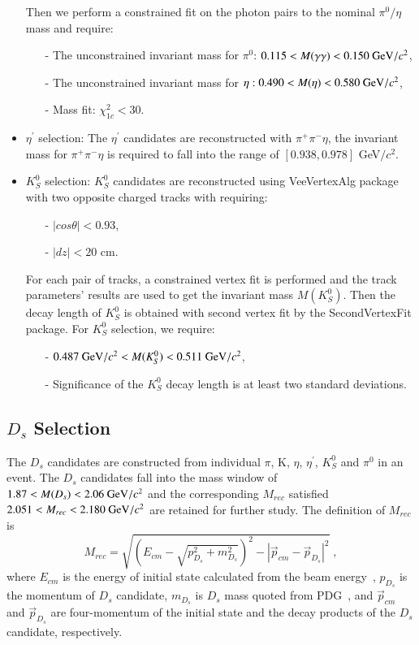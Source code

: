 \begin{itemize}
		Then we perform a constrained fit on the photon pairs to the nominal $\pi^{0}/\eta$ mass and require:
		\begin{itemize}
            \item[-] The unconstrained invariant mass for $\pi^{0}$: $0.115 < M(\gamma\gamma) < 0.150\ {\rm GeV}/c^{2}$,
            \item[-] The unconstrained invariant mass for $\eta: 0.490 < M(\eta) < 0.580\ {\rm GeV}/c^{2}$,
			\item[-] Mass fit: $\chi_{1c}^{2} < 30$.
		\end{itemize}
	\item $\eta^{'}$ selection: The $\eta^{'}$ candidates are reconstructed with $\pi^{+}\pi^{-}\eta$, the invariant mass for $\pi^{+}\pi^{-}\eta$ is required to fall into the range of $[0.938, 0.978]$ GeV$/c^{2}$.
	\item $K_{S}^{0}$ selection: $K_{S}^{0}$ candidates are reconstructed using VeeVertexAlg package with two opposite charged tracks with requiring:
		\begin{itemize}
			\item[-] $|cos\theta| < 0.93$,
			\item[-] $|dz| < 20$ cm.
		\end{itemize}

		For each pair of tracks, a constrained vertex fit is performed and the track parameters' results are used to get the invariant mass $M(K_{S}^{0})$. Then the decay length of $K_{S}^{0}$ is obtained with second vertex 
		fit by the SecondVertexFit package. For $K_{S}^{0}$ selection, we require:
		\begin{itemize}
            \item[-] ${\rm 0.487\ GeV}/c^{2} < M(K_S^{0}) < 0.511\ {\rm GeV}/c^{2}$,
			\item[-] Significance of the $K_{S}^{0}$ decay length is at least two standard deviations.
		\end{itemize}

\end{itemize}
\subsection{$D_{s}$ Selection}
The $D_{s}$ candidates are constructed from individual $\pi$, K, $\eta$, $\eta^{'}$, $K_{S}^{0}$ and $\pi^{0}$ in an event.
The $D_{s}$ candidates fall into the mass window of $1.87 < M(D_{s}) < 2.06\ {\rm GeV}/c^{2}$ and 
the corresponding $M_{rec}$ satisfied $2.051 < M_{rec} < 2.180\ {\rm GeV}/c^{2}$ are retained for further study. The definition of $M_{rec}$ is
\begin{equation}
    M_{rec} = \sqrt{(E_{cm} - \sqrt{p_{D_{s}}^{2} + m_{D_{s}}^{2}})^{2} - |\vec p_{cm} - \vec p_{D_{s}} | ^{2}} \; , \label{con:inventoryflow}
\end{equation}
where $E_{cm}$ is the energy of initial state calculated from the beam energy~\cite{DocDB 580-v1}, $p_{D_{s}}$ is the momentum of $D_{s}$ candidate, $m_{D_{s}}$ is $D_{s}$ mass quoted from PDG~\cite{PDG2018}, and $\vec p_{cm}$ and $\vec p_{D_{s}}$ are four-momentum of the initial state and the decay products of the $D_{s}$ candidate, respectively.


